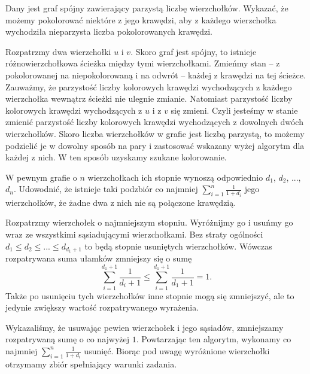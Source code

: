 \vspace{5px}

\newpage

\begin{problem}{4}
	Dany jest graf spójny zawierający parzystą liczbę wierzchołków. Wykazać, że możemy pokolorować niektóre z jego krawędzi, aby z każdego wierzchołka wychodziła nieparzysta liczba pokolorowanych krawędzi.
\end{problem}

\noindent
Rozpatrzmy dwa wierzchołki $u$ i $v$. Skoro graf jest spójny, to istnieje różnowierzchołkowa ścieżka między tymi wierzchołkami. Zmieńmy stan -- z pokolorowanej na niepokolorowaną i na odwrót --  każdej z krawędzi na tej ścieżce. Zauważmy, że parzystość liczby kolorowych krawędzi wychodzących z każdego wierzchołka wewnątrz ścieżki nie ulegnie zmianie. Natomiast parzystość liczby kolorowych krawędzi wychodzących z $u$ i z $v$ się zmieni. Czyli jesteśmy w stanie zmienić parzystość liczby kolorowych krawędzi wychodzących z dowolnych dwóch wierzchołków. Skoro liczba wierzchołków w grafie jest liczbą parzystą, to możemy podzielić je w dowolny sposób na pary i zastosować wskazany wyżej algorytm dla każdej z nich. W ten sposób uzyskamy szukane kolorowanie.

\vspace{5px}

\begin{problem}{5}
	W pewnym grafie o $n$ wierzchołkach ich stopnie wynoszą odpowiednio $d_1$, $d_2$, ..., $d_n$. Udowodnić, że istnieje taki podzbiór co najmniej $\sum^{n}_{i = 1} \frac{1}{1 + d_i}$ jego wierzchołków, że żadne dwa z nich nie są połączone krawędzią.
\end{problem}

\noindent
Rozpatrzmy wierzchołek o najmniejszym stopniu. Wyróżnijmy go i usuńmy go wraz ze wszystkimi sąsiadującymi wierzchołkami. Bez straty ogólności $d_1 \leqslant d_2 \leqslant ... \leqslant d_{d_1 + 1}$ to będą stopnie usuniętych wierzchołków. Wówczas rozpatrywana suma ułamków zmniejszy się o sumę
\[
	\sum^{d_1 + 1}_{i = 1} \frac{1}{d_i + 1} \leqslant \sum^{d_1 + 1}_{i = 1} \frac{1}{d_1 + 1} = 1.
\]
Także po usunięciu tych wierzchołków inne stopnie mogą się zmniejszyć, ale to jedynie zwiększy wartość rozpatrywanego wyrażenia.

\vspace{10px}
\noindent
Wykazaliśmy, że usuwając pewien wierzchołek i jego sąsiadów, zmniejszamy rozpatrywaną sumę o co najwyżej $1$. Powtarzając ten algorytm, wykonamy co najmniej $\sum^{n}_{i = 1} \frac{1}{1 + d_i}$ usunięć. Biorąc pod uwagę wyróżnione wierzchołki otrzymamy zbiór spełniający warunki zadania.

